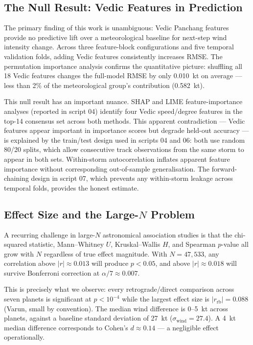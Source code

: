 \documentclass[12pt,a4paper]{article}
\begin{document}
\subsection{The Null Result: Vedic Features in Prediction}

The primary finding of this work is unambiguous: Vedic Panchang features provide
no predictive lift over a meteorological baseline for next-step wind intensity
change.
Across three feature-block configurations and five temporal validation folds,
adding Vedic features consistently increases RMSE.
The permutation importance analysis confirms the quantitative picture: shuffling
all 18 Vedic features changes the full-model RMSE by only 0.010~kt on average —
less than 2\% of the meteorological group's contribution (0.582~kt).

This null result has an important nuance. SHAP and LIME feature-importance
analyses (reported in script 04) identify four Vedic speed/degree features in
the top-14 consensus set across both methods.
This apparent contradiction — Vedic features appear important in importance scores
but degrade held-out accuracy — is explained by the train/test design used in
scripts 04 and 06: both use random 80/20 splits, which allow consecutive track
observations from the same storm to appear in both sets.
Within-storm autocorrelation inflates apparent feature importance without
corresponding out-of-sample generalisation.
The forward-chaining design in script 07, which prevents any within-storm leakage
across temporal folds, provides the honest estimate.

\subsection{Effect Size and the Large-\texorpdfstring{$N$}{N} Problem}

A recurring challenge in large-$N$ astronomical association studies is that
the chi-squared statistic, Mann--Whitney $U$, Kruskal--Wallis $H$, and
Spearman $p$-value all grow with $N$ regardless of true effect magnitude.
With $N = 47{,}533$, any correlation above $|r| \approx 0.013$ will produce
$p < 0.05$, and above $|r| \approx 0.018$ will survive Bonferroni correction
at $\alpha/7 \approx 0.007$.

This is precisely what we observe: every retrograde/direct comparison across
seven planets is significant at $p < 10^{-4}$ while the largest effect size
is $|r_\text{rb}| = 0.088$ (Varun, small by convention).
The median wind difference is 0--5~kt across planets, against a baseline
standard deviation of 27~kt ($\sigma_\text{wind} = 27.4$).
A 4~kt median difference corresponds to Cohen's $d \approx 0.14$ — a negligible
effect operationally.
\end{document}
